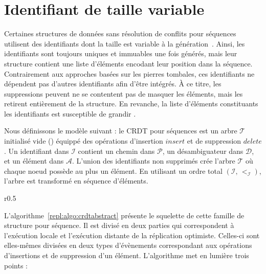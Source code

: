
\section{Identifiant de taille variable}

Certaines structures de données sans résolution de conflits pour séquences
utilisent des identifiants dont la taille est variable à la
génération~\cite{andre2013supporting, preguica2009commutative,
  weiss2009logoot}. Ainsi, les identifiants sont toujours uniques et immuables
une fois générés, mais leur structure contient une liste d'éléments encodant
leur position dans la séquence.  Contrairement aux approches basées sur les
pierres tombales, ces identifiants ne dépendent pas d'autres identifiants afin
d'être intégrés. À ce titre, les suppressions peuvent ne se contentent pas de
masquer les éléments, mais les retirent entièrement de la structure. En
revanche, la liste d'éléments constituants les identifiants est susceptible de
grandir . 

Nous définissons le modèle suivant : le CRDT pour séquences est un arbre
$\mathcal{T}$ initialisé vide () équippé des opérations d'insertion
$insert$ et de suppression $delete$. Un identifiant dans $\mathcal{I}$ contient
un chemin dans $\mathcal{P}$, un désambiguateur dans $\mathcal{D}$, et un
élément dans $\mathcal{A}$. L'union des identifiants non supprimés crée l'arbre
$\mathcal{T}$ où chaque noeud possède au plus un élément.  En utilisant un ordre
total $(\mathcal{I},\, <_\mathcal{I})$, l'arbre est transformé en séquence
d'éléments. 

\begin{wrapfigure}{r}{0.5\textwidth}
  \vspace{-35pt} %
  \begin{minipage}[t]{0.5\textwidth}
    \begin{algorithm}[H]
      
      \caption{\label{repl:algo:crdtabstract} Squelette.}
    \end{algorithm}
  \end{minipage}
  \vspace{-35pt}
\end{wrapfigure}

L'algorithme~\ref{repl:algo:crdtabstract} présente le squelette de cette famille
de structure pour séquence.  Il est divisé en deux parties qui correspondent à
l'exécution locale et l'exécution distante de la réplication
optimiste. Celles-ci sont elles-mêmes divisées en deux types d'évènements
correspondant aux opérations d'insertions et de suppression d'un
élément. L'algorithme met en lumière trois points :

